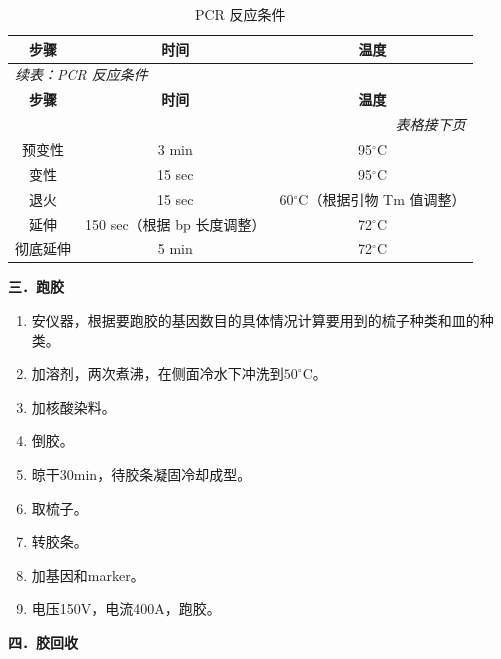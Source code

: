 \begin{longtable}{ccc}
  \caption{PCR 反应条件} \\
  \toprule
  \textbf{步骤} & \textbf{时间} & \textbf{温度} \\
  \midrule
  \endfirsthead

  \multicolumn{3}{l}{\textit{续表：PCR 反应条件}} \\
  \toprule
  \textbf{步骤} & \textbf{时间} & \textbf{温度} \\
  \midrule
  \endhead

  \bottomrule
  \multicolumn{3}{r}{\textit{表格接下页}} \\
  \endfoot

  \bottomrule
  \endlastfoot

  预变性 & 3 min & 95$^\circ$C \\
  变性   & 15 sec & 95$^\circ$C \\
  退火   & 15 sec & 60$^\circ$C（根据引物 Tm 值调整） \\
  延伸   & 150 sec（根据 bp 长度调整） & 72$^\circ$C \\
  彻底延伸 & 5 min & 72$^\circ$C \\

\end{longtable}

\textbf{三．跑胶}

\begin{enumerate}[itemsep=0.1em]
  \item 安仪器，根据要跑胶的基因数目的具体情况计算要用到的梳子种类和皿的种类。
  \item 加溶剂，两次煮沸，在侧面冷水下冲洗到$50^\circ\text{C}$。
  \item 加核酸染料。
  \item 倒胶。
  \item 晾干30min，待胶条凝固冷却成型。
  \item 取梳子。
  \item 转胶条。
  \item 加基因和marker。
  \item 电压150V，电流400A，跑胶。
\end{enumerate}

\textbf{四．胶回收}

